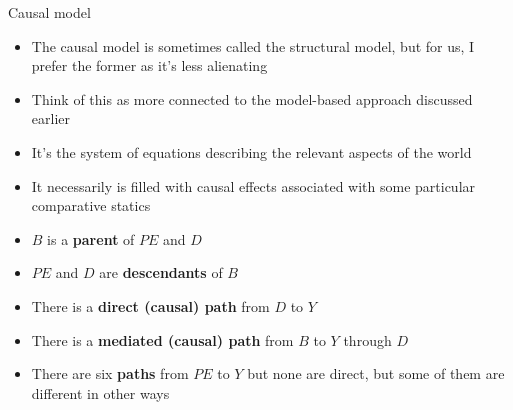 \documentclass{beamer}
\begin{document}
\begin{frame}{Causal model}

  \begin{itemize}
    \item The causal model is sometimes called the structural model, but for us, I prefer the former as it's less alienating
    \item Think of this as more connected to the model-based approach discussed earlier
    \item It's the system of equations describing the relevant aspects of the world
    \item It necessarily is filled with causal effects associated with some particular comparative statics
  \end{itemize}

\end{frame}

\begin{frame}[plain]

  \begin{center}
  \end{center}

  \bigskip
  \begin{itemize}
    \item $B$ is a \textbf{parent} of $PE$ and $D$
    \item $PE$ and $D$ are \textbf{descendants} of $B$
    \item There is a \textbf{direct (causal) path} from $D$ to $Y$
    \item There is a \textbf{mediated (causal) path} from $B$ to $Y$ through $D$
    \item There are six \textbf{paths} from $PE$ to $Y$ but none are direct, but some of them are different in other ways
  \end{itemize}
\end{frame}
\end{document}
